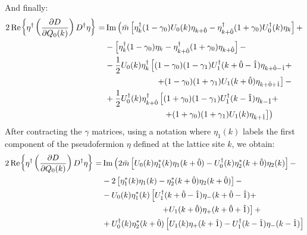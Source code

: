 And finally:
\begin{equation}
    \begin{split}
                2 \Re{\eta^\dagger \left( \pdv{D}{Q_0(k)} \right) D^\dagger \eta} = & \Im \left(\Bar{m} \left[ \eta^\dagger_k (1 - \gamma_0) U_0 (k) \eta_{k + \hat{0}} - \eta^\dagger_{k + \hat{0}} (1 + \gamma_0) U_0^\dagger(k)\eta_k \right] + \right. \\
         & - \left[ \eta^\dagger_k (1 - \gamma_0) \eta_k - \eta^\dagger_{k + \hat{0}} (1 + \gamma_0) \eta_{k + \hat{0}} \right] - \\
        & - \frac{1}{2} U_0(k) \eta_k^\dagger \left[ (1-\gamma_0)(1 - \gamma_1) U_1^\dagger(k + \hat{0} - \hat{1}) \eta_{k + \hat{0} -\hat{1}} + \right.  \\ 
        & \,\,\,\,\,\,\,\,\,\,\,\,\,\,\,\,\,\,\,\,\,\,\,\,\,\,\,\,\,\,\,\,\,\,\,\,\, \left. + (1 - \gamma_0)(1 + \gamma_1) U_1 (k + \hat{0}) \eta_{k + \hat{0} + \hat{1}} \right] - \\
        & + \frac{1}{2} U_0^\dagger(k) \eta_{k + \hat{0}}^\dagger \left[(1+\gamma_0)(1 - \gamma_1) U_1^\dagger(k-\hat{1}) \eta_{k - \hat{1}} +  \right. \\
        & \,\,\,\,\,\,\,\,\,\,\,\,\,\,\,\,\,\,\,\,\,\,\,\,\,\,\,\,\,\,\,\,\,\,\,\,\,\,\,\,\,\, \left. \left. + (1 + \gamma_0)(1 + \gamma_1) U_1 (k) \eta_{k + \hat{1}} \right]\right)
    \end{split}
\end{equation}
After contracting the $\gamma$ matrices, using a notation where $\eta_1(k)$ labels the first component of the pseudofermion $\eta$ defined at the lattice site $k$, we obtain:
\begin{equation}
    \begin{split}
         2 \Re{\eta^\dagger \left( \pdv{D}{Q_0(k)} \right) D^\dagger \eta} = & \Im \left( 2 \Bar{m} \left[U_0 (k) \eta_1^*(k)\eta_1(k + \hat{0}) - U_0^\dagger(k) \eta_2^*(k + \hat{0})\eta_2(k) \right] - \right. \\
         & - 2 \left[ \eta_1^*(k) \eta_1(k) - \eta_2^*(k + \hat{0}) \eta_2(k + \hat{0}) \right] - \\
        & - U_0(k) \eta_1^*(k) \left[ U_1^\dagger(k + \hat{0} - \hat{1}) \eta_-(k + \hat{0} - \hat{1}) + \right.  \\ 
        & \,\,\,\,\,\,\,\,\,\,\,\,\,\,\,\,\,\,\,\,\,\,\,\,\,\,\,\,\,\,\,\,\,\,\,\,\,\,\,\,\,\,\,\, \left. + U_1(k + \hat{0}) \eta_+ (k + \hat{0} + \hat{1}) \right] + \\
        & + U_0^\dagger(k) \eta_{2}^*(k + \hat{0}) \left[ U_1(k) \eta_+ (k + \hat{1}) - U_1^\dagger(k - \hat{1}) \eta_{-}(k - \hat{1})  \right]
    \end{split}
\end{equation}
